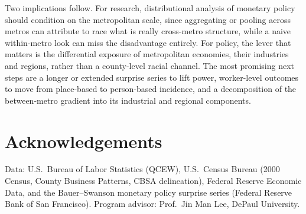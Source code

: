 \documentclass[11pt]{article}
\begin{document}
Two implications follow. For research, distributional analysis of monetary policy should
condition on the metropolitan scale, since aggregating or pooling across metros can attribute
to race what is really cross-metro structure, while a naive within-metro look can miss the
disadvantage entirely. For policy, the lever that matters is the differential exposure of
metropolitan economies, their industries and regions, rather than a county-level racial channel.
The most promising next steps are a longer or extended surprise series to lift power,
worker-level outcomes to move from place-based to person-based incidence, and a decomposition of
the between-metro gradient into its industrial and regional components.

\section*{Acknowledgements}
Data: U.S.\ Bureau of Labor Statistics (QCEW), U.S.\ Census Bureau (2000 Census, County
Business Patterns, CBSA delineation), Federal Reserve Economic Data, and the Bauer--Swanson
monetary policy surprise series (Federal Reserve Bank of San Francisco). Program advisor:
Prof.\ Jin Man Lee, DePaul University.
\end{document}
